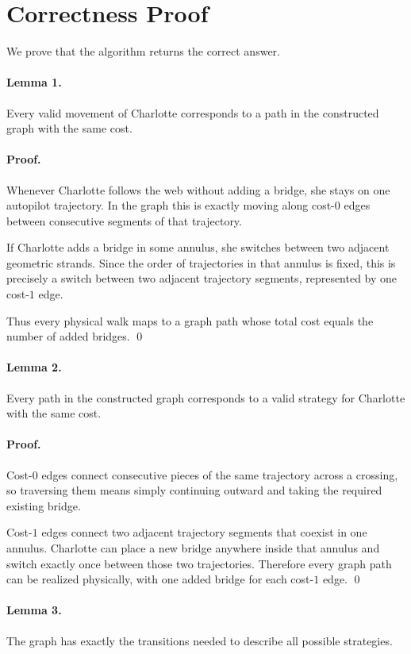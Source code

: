 \documentclass[11pt]{article}
\begin{document}
\section*{Correctness Proof}

We prove that the algorithm returns the correct answer.

\paragraph{Lemma 1.}
Every valid movement of Charlotte corresponds to a path in the constructed graph with the same cost.

\paragraph{Proof.}
Whenever Charlotte follows the web without adding a bridge, she stays on one autopilot trajectory. In
the graph this is exactly moving along cost-$0$ edges between consecutive segments of that trajectory.

If Charlotte adds a bridge in some annulus, she switches between two adjacent geometric strands. Since
the order of trajectories in that annulus is fixed, this is precisely a switch between two adjacent
trajectory segments, represented by one cost-$1$ edge.

Thus every physical walk maps to a graph path whose total cost equals the number of added bridges. \qed

\paragraph{Lemma 2.}
Every path in the constructed graph corresponds to a valid strategy for Charlotte with the same cost.

\paragraph{Proof.}
Cost-$0$ edges connect consecutive pieces of the same trajectory across a crossing, so traversing them
means simply continuing outward and taking the required existing bridge.

Cost-$1$ edges connect two adjacent trajectory segments that coexist in one annulus. Charlotte can place a
new bridge anywhere inside that annulus and switch exactly once between those two trajectories. Therefore
every graph path can be realized physically, with one added bridge for each cost-$1$ edge. \qed

\paragraph{Lemma 3.}
The graph has exactly the transitions needed to describe all possible strategies.
\end{document}
